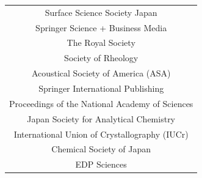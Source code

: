 \begin{table}[H]
\begin{tabular}{||c||}
Surface Science Society Japan                     \\
Springer Science + Business Media                 \\
The Royal Society                                 \\
Society of Rheology                               \\
Acoustical Society of America (ASA)               \\
Springer International Publishing                 \\
Proceedings of the National Academy of Sciences   \\
Japan Society for Analytical Chemistry            \\
International Union of Crystallography (IUCr)     \\
Chemical Society of Japan                         \\
EDP Sciences                                      \\
\hline
\end{tabular}
\end{table}

